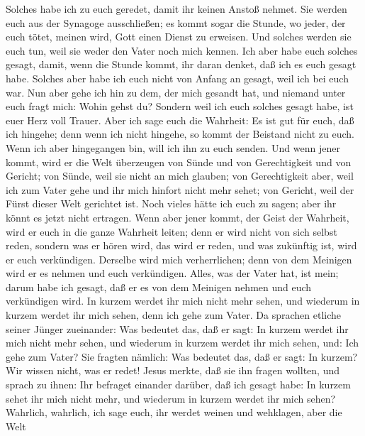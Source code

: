  Solches habe ich zu euch geredet, damit ihr keinen Anstoß
nehmet.  Sie werden euch aus der Synagoge ausschließen; es
kommt sogar die Stunde, wo jeder, der euch tötet, meinen wird, Gott
einen Dienst zu erweisen.  Und solches werden sie euch
tun, weil sie weder den Vater noch mich kennen.  Ich aber
habe euch solches gesagt, damit, wenn die Stunde kommt, ihr daran
denket, daß ich es euch gesagt habe. Solches aber habe ich euch nicht
von Anfang an gesagt, weil ich bei euch war.  Nun aber
gehe ich hin zu dem, der mich gesandt hat, und niemand unter euch fragt
mich: Wohin gehst du?  Sondern weil ich euch solches
gesagt habe, ist euer Herz voll Trauer.  Aber ich sage
euch die Wahrheit: Es ist gut für euch, daß ich hingehe; denn wenn ich
nicht hingehe, so kommt der Beistand nicht zu euch. Wenn ich aber
hingegangen bin, will ich ihn zu euch senden.  Und wenn
jener kommt, wird er die Welt überzeugen von Sünde und von Gerechtigkeit
und von Gericht;  von Sünde, weil sie nicht an mich
glauben;  von Gerechtigkeit aber, weil ich zum Vater gehe
und ihr mich hinfort nicht mehr sehet;  von Gericht, weil
der Fürst dieser Welt gerichtet ist.  Noch vieles hätte
ich euch zu sagen; aber ihr könnt es jetzt nicht ertragen.
 Wenn aber jener kommt, der Geist der Wahrheit, wird er
euch in die ganze Wahrheit leiten; denn er wird nicht von sich selbst
reden, sondern was er hören wird, das wird er reden, und was zukünftig
ist, wird er euch verkündigen.  Derselbe wird mich
verherrlichen; denn von dem Meinigen wird er es nehmen und euch
verkündigen.  Alles, was der Vater hat, ist mein; darum
habe ich gesagt, daß er es von dem Meinigen nehmen und euch verkündigen
wird.  In kurzem werdet ihr mich nicht mehr sehen, und
wiederum in kurzem werdet ihr mich sehen, denn ich gehe zum Vater.
 Da sprachen etliche seiner Jünger zueinander: Was
bedeutet das, daß er sagt: In kurzem werdet ihr mich nicht mehr sehen,
und wiederum in kurzem werdet ihr mich sehen, und: Ich gehe zum Vater?
 Sie fragten nämlich: Was bedeutet das, daß er sagt: In
kurzem? Wir wissen nicht, was er redet!  Jesus merkte,
daß sie ihn fragen wollten, und sprach zu ihnen: Ihr befraget einander
darüber, daß ich gesagt habe: In kurzem sehet ihr mich nicht mehr, und
wiederum in kurzem werdet ihr mich sehen?  Wahrlich,
wahrlich, ich sage euch, ihr werdet weinen und wehklagen, aber die Welt
